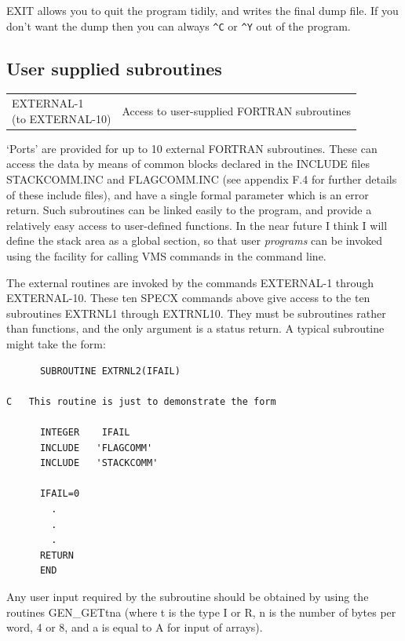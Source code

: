 \documentclass[11pt,twoside]{report}
\begin{document}
EXIT allows you to quit the program tidily, and writes the final dump file. If
you don't want the dump then you can always \verb+^C+ or \verb+^Y+ out of the
program.

\subsection{User supplied subroutines}

\label{externals}
\begin{tabular}{ll}
\parbox[T]{1.5in}{EXTERNAL-1\\
  (to EXTERNAL-10)}     & Access to user-supplied FORTRAN subroutines\\
\end{tabular}

`Ports' are provided for up to 10 external FORTRAN subroutines. These can
access the data by means of common blocks declared in the INCLUDE files
STACKCOMM.INC and FLAGCOMM.INC (see
appendix F.4 for further details of these include files), and have a single
formal parameter which is an error return. Such subroutines can be linked
easily to the program, and provide a relatively easy access to user-defined
functions. In the near future I think I will define the stack area as a global
section, so that user {\em programs} can be invoked using the facility for
calling VMS commands in the command line.

The external routines are invoked by the commands EXTERNAL-1 through
EXTERNAL-10. These ten SPECX commands above give access to the ten subroutines
EXTRNL1 through EXTRNL10. They must be subroutines rather than functions, and
the only argument is a status return. A typical subroutine might take the form:

\begin{verbatim}
      SUBROUTINE EXTRNL2(IFAIL)

C   This routine is just to demonstrate the form

      INTEGER    IFAIL
      INCLUDE   'FLAGCOMM'
      INCLUDE   'STACKCOMM'

      IFAIL=0
        .
        .
        .
      RETURN
      END
\end{verbatim}

Any user input required by the subroutine should be obtained by using the
rout\-ines GEN\_GETtna (where t is the type I
or R, n is the number of bytes per word, 4 or 8, and a is equal to A for input
of arrays).
\end{document}
